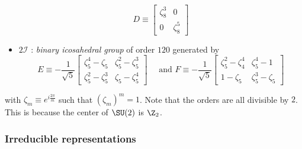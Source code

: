 \documentclass{worksheetclass}
\begin{document}
\begin{itemize}
\begin{equation}
                    D \equiv 
                    \begin{bmatrix}
                        \zeta^3_8 & 0\\
                        0 & \zeta^5_8
                    \end{bmatrix}
                \end{equation}
                \item $2\mathcal{I}$ : \emph{binary icosahedral group} of order $120$ generated by
                \begin{equation}
                    E \equiv -\frac{1}{\sqrt{5}}
                    \begin{bmatrix}
                        \zeta^4_5-\zeta_5 & \zeta^2_5-\zeta^3_5\\
                        \zeta^2_5-\zeta^3_5 & \zeta_5-\zeta^4_5
                    \end{bmatrix}\quad \text{ and }
                    F \equiv -\frac{1}{\sqrt{5}}
                    \begin{bmatrix}
                        \zeta^2_5-\zeta^4_4 & \zeta^4_5-1\\
                        1-\zeta_5 & \zeta^3_5-\zeta_5
                    \end{bmatrix}
                \end{equation}
            \end{itemize}
            with $\zeta_m\equiv e^{i\frac{2\pi}{m}}$ such that $(\zeta_m)^m=1$. Note that the orders are all divisible by $2$. This is because the center of $\SU(2)$ is $\Z_2$.

        \subsubsection{Irreducible representations}\label{sec:irrep}
\end{document}
